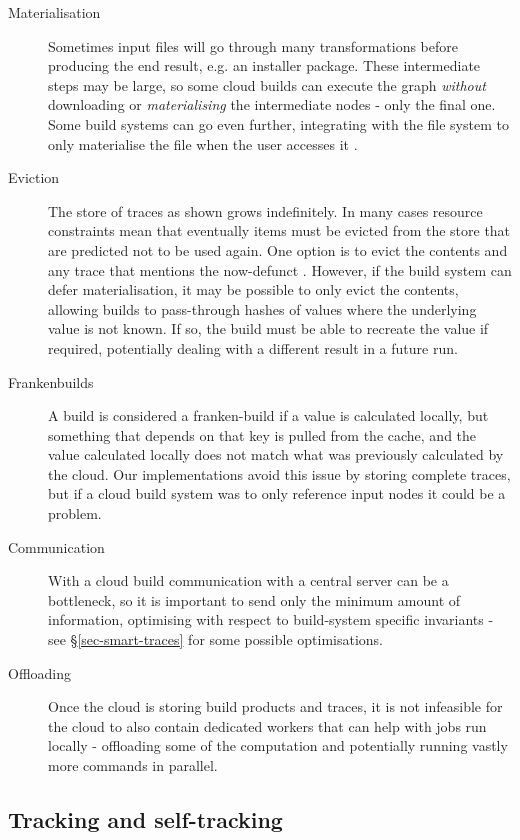 \begin{description}
\item[Materialisation] Sometimes input files will go through many transformations before producing the end result, e.g. an installer package. These intermediate steps may be large, so some cloud builds can execute the graph \textit{without} downloading or \textit{materialising} the intermediate nodes - only the final one. Some build systems can go even further, integrating with the file system to only materialise the file when the user accesses it \cite{google_internal}.
\item[Eviction] The store of traces as shown grows indefinitely. In many cases resource constraints mean that eventually items must be evicted from the store that are predicted not to be used again. One option is to evict the contents and any trace that mentions the now-defunct . However, if the build system can defer materialisation, it may be possible to only evict the contents, allowing builds to pass-through hashes of values where the underlying value is not known. If so, the build must be able to recreate the value if required, potentially dealing with a different result in a future run.
\item[Frankenbuilds] A build is considered a franken-build \cite{cloudbuild} if a value is calculated locally, but something that depends on that key is pulled from the cache, and the value calculated locally does not match what was previously calculated by the cloud. Our implementations avoid this issue by storing complete traces, but if a cloud build system was to only reference input nodes it could be a problem.
\item[Communication] With a cloud build communication with a central server can be a bottleneck, so it is important to send only the minimum amount of information, optimising with respect to build-system specific invariants - see \S\ref{sec-smart-traces} for some possible optimisations.
\item[Offloading] Once the cloud is storing build products and traces, it is not infeasible for the cloud to also contain dedicated workers that can help with jobs run locally - offloading some of the computation and potentially running vastly more commands in parallel.
\end{description}

\subsection{Tracking and self-tracking}\label{sec-tracking-aspects}


